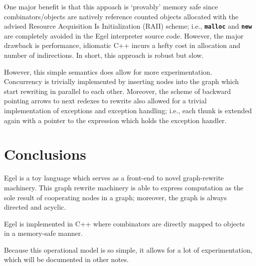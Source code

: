 \documentclass{research4cacm}
\newcommand{\code}[1]{{\bf\texttt{#1}}}
\begin{document}
One major benefit is that this appoach is `provably'
memory safe since combinators/objects are natively
reference counted objects allocated with the advised
Resource Acquisition Is Initialization (RAII) scheme; i.e.,
\code{malloc} and \code{new} are 
completely avoided in the Egel interpreter source
code. However, the major drawback is
performance, idiomatic C++ incurs a hefty cost in
allocation and number of indirections. In short,
this approach is robust but slow.

However, this simple semantics does allow for
more experimentation. Concurrency is trivially
implemented by inserting nodes into the graph
which start rewriting in parallel to each other.
Moreover, the scheme of backward pointing arrows
to next redexes to rewrite also allowed for a
trivial implementation of exceptions and 
exception handling; i.e., each thunk is extended
again with a pointer to the expression which
holds the exception handler.

\section{Conclusions}

Egel is a toy language which serves as a front-end
to novel graph-rewrite machinery. This graph rewrite
machinery is able to express computation as the 
sole result of cooperating nodes in a graph; moreover,
the graph is always directed and acyclic.

Egel is implemented in C++ where combinators
are directly mapped to objects in a memory-safe
manner.

Because this operational model is so simple, it
allows for a lot of experimentation, which will
be documented in other notes.



\balancecolumns
\end{document}

